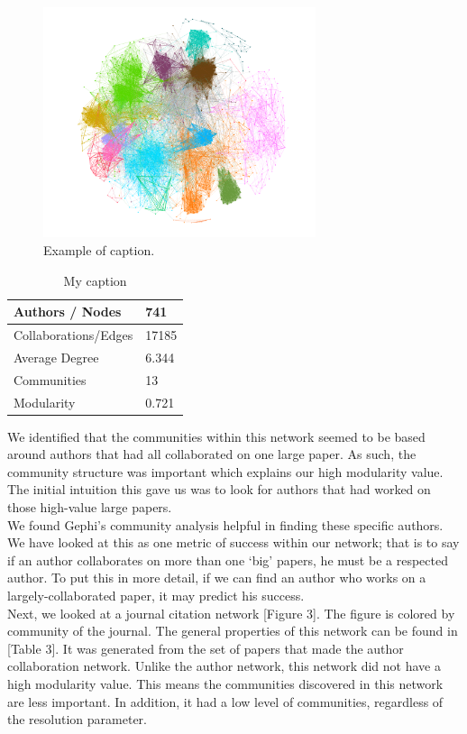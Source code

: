 \documentclass[times, 10pt,twocolumn]{article}
\begin{document}
\begin{figure}[h]
   \includegraphics[width=8cm]{figure2.png}
   \caption{Example of caption.}
\end{figure}

\begin{table}[h]
\centering
\caption{My caption}
\label{my-label}
\begin{tabular}{|l|l|}
\hline
Authors / Nodes      & 741   \\ \hline
Collaborations/Edges & 17185 \\ \hline
Average Degree       & 6.344 \\ \hline
Communities          & 13    \\ \hline
Modularity           & 0.721 \\ \hline
\end{tabular}
\end{table}

We identified that the communities within this network seemed to be based around authors that had all collaborated on one large paper. As such, the community structure was important which explains our high modularity value. The initial intuition this gave us was to look for authors that had worked on those high-value large papers. \\

We found Gephi’s community analysis helpful in finding these specific authors. We have looked at this as one metric of success within our network; that is to say if an author collaborates on more than one ‘big’ papers, he must be a respected author. To put this in more detail, if we can find an author who works on a largely-collaborated paper, it may predict his success.\\

Next, we looked at a journal citation network [Figure 3]. The figure is colored by community of the journal. The general properties of this network can be found in [Table 3]. It was generated from the set of papers that made the author collaboration network. Unlike the author network, this network did not have a high modularity value. This means the communities discovered in this network are less important. In addition, it had a low level of communities, regardless of the resolution parameter. \\
\end{document}
